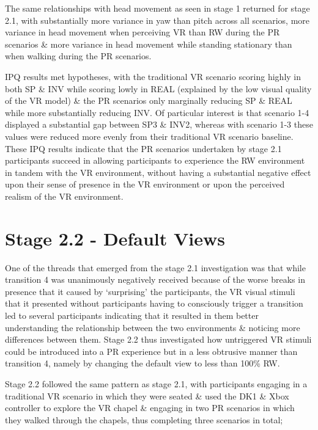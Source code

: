 The same relationships with head movement as seen in stage 1 returned for stage 2.1, with substantially more variance in yaw than pitch across all scenarios, more variance in head movement when perceiving VR than RW during the PR scenarios \& more variance in head movement while standing stationary than when walking during the PR scenarios.

IPQ results met hypotheses, with the traditional VR scenario scoring highly in both SP \& INV while scoring lowly in REAL (explained by the low visual quality of the VR model) \& the PR scenarios only marginally reducing SP \& REAL while more substantially reducing INV. Of particular interest is that scenario 1-4 displayed a substantial gap between SP3 \& INV2, whereas with scenario 1-3 these values were reduced more evenly from their traditional VR scenario baseline. These IPQ results indicate that the PR scenarios undertaken by stage 2.1 participants succeed in allowing participants to experience the RW environment in tandem with the VR environment, without having a substantial negative effect upon their sense of presence in the VR environment or upon the perceived realism of the VR environment.


\clearpage


\section{Stage 2.2 - Default Views}

One of the threads that emerged from the stage 2.1 investigation was that while transition 4 was unanimously negatively received because of the worse breaks in presence that it caused by `surprising' the participants, the VR visual stimuli that it presented without participants having to consciously trigger a transition led to several participants indicating that it resulted in them better understanding the relationship between the two environments \& noticing more differences between them. Stage 2.2 thus investigated how untriggered VR stimuli could be introduced into a PR experience but in a less obtrusive manner than transition 4, namely by changing the default view to less than 100\% RW.

Stage 2.2 followed the same pattern as stage 2.1, with participants engaging in a traditional VR scenario in which they were seated \& used the DK1 \& Xbox controller to explore the VR chapel \& engaging in two PR scenarios in which they walked through the chapels, thus completing three scenarios in total;

